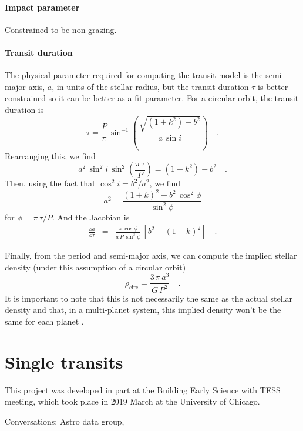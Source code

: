 \documentclass[modern]{aastex62}
\begin{document}
\paragraph{Impact parameter}
Constrained to be non-grazing.

\paragraph{Transit duration}
The physical parameter required for computing the transit model is the semi-major axis, $a$, in units of the stellar radius, but the transit duration $\tau$ is better constrained so it can be better as a fit parameter.
For a circular orbit, the transit duration is \citep{Winn:2010}
\begin{equation}
  \tau = \frac{P}{\pi}\,\sin^{-1}\left( \frac{\sqrt{(1 + k^2) - b^2}}{a\,\sin i} \right) \quad.
\end{equation}
Rearranging this, we find
\begin{equation}
  a^2\,\sin^2 i\,\sin^2\left(\frac{\pi\,\tau}{P}\right) = (1 + k^2) - b^2 \quad.
\end{equation}
Then, using the fact that $\cos^2 i = b^2 / a^2$, we find
\begin{equation}
  a^2 = \frac{(1 + k)^2 - b^2\,\cos^2\phi}{\sin^2\phi}
\end{equation}
for $\phi = \pi\,\tau / P$.
And the Jacobian is
\begin{eqnarray}
  \frac{\dd a}{\dd \tau} &=& \frac{\pi\,\cos \phi}{a\,P\,\sin^3 \phi}\,\left[b^2 - (1 + k)^2\right] \quad.
\end{eqnarray}

Finally, from the period and semi-major axis, we can compute the implied stellar density (under this assumption of a circular orbit)
\begin{equation}
  \rho_\mathrm{circ} = \frac{3\,\pi\,a^3}{G\,P^2} \quad.
\end{equation}
It is important to note that this is not necessarily the same as the actual stellar density and that, in a multi-planet system, this implied density won't be the same for each planet \citep[see, for example,][]{Dawson:2012, Kipping:2012}.

\section{Single transits}



\acknowledgements

This project was developed in part at the Building Early Science with TESS meeting, which took place in 2019 March at the University of Chicago.

Conversations:
Astro data group,


\appendix

\newpage

\end{document}
